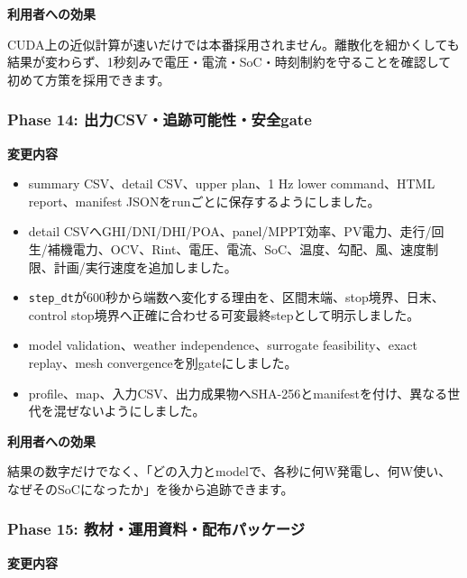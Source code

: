 \documentclass[
  japanese,
  a4paper,
  11pt]{article}
\providecommand{\tightlist}{%
  \setlength{\itemsep}{0pt}\setlength{\parskip}{0pt}}
\begin{document}
\textbf{利用者への効果}

CUDA上の近似計算が速いだけでは本番採用されません。離散化を細かくしても結果が変わらず、1秒刻みで電圧・電流・SoC・時刻制約を守ることを確認して初めて方策を採用できます。

\subsubsection{Phase 14:
出力CSV・追跡可能性・安全gate}\label{phase-14-ux51faux529bcsvux8ffdux8de1ux53efux80fdux6027ux5b89ux5168gate}

\textbf{変更内容}

\begin{itemize}
\tightlist
\item
  summary CSV、detail CSV、upper plan、1 Hz lower command、HTML
  report、manifest JSONをrunごとに保存するようにしました。
\item
  detail
  CSVへGHI/DNI/DHI/POA、panel/MPPT効率、PV電力、走行/回生/補機電力、OCV、Rint、電圧、電流、SoC、温度、勾配、風、速度制限、計画/実行速度を追加しました。
\item
  \texttt{step\_dt}が600秒から端数へ変化する理由を、区間末端、stop境界、日末、control
  stop境界へ正確に合わせる可変最終stepとして明示しました。
\item
  model validation、weather independence、surrogate feasibility、exact
  replay、mesh convergenceを別gateにしました。
\item
  profile、map、入力CSV、出力成果物へSHA-256とmanifestを付け、異なる世代を混ぜないようにしました。
\end{itemize}

\textbf{利用者への効果}

結果の数字だけでなく、「どの入力とmodelで、各秒に何W発電し、何W使い、なぜそのSoCになったか」を後から追跡できます。

\subsubsection{Phase 15:
教材・運用資料・配布パッケージ}\label{phase-15-ux6559ux6750ux904bux7528ux8cc7ux6599ux914dux5e03ux30d1ux30c3ux30b1ux30fcux30b8}

\textbf{変更内容}
\end{document}
